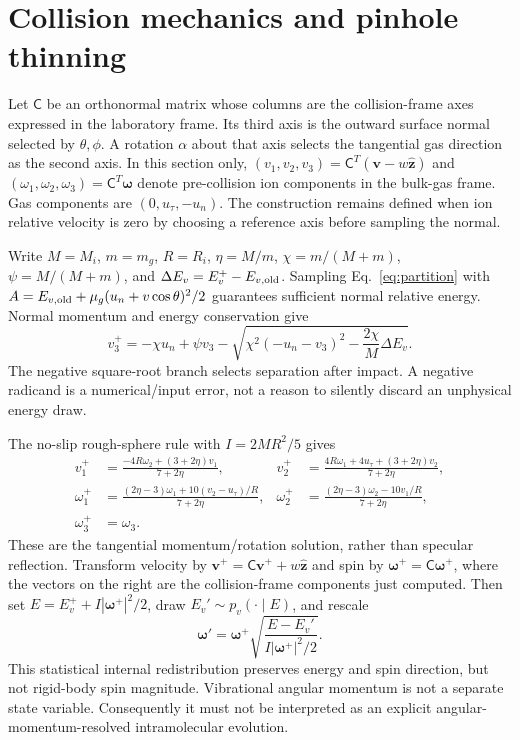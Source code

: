 \documentclass[10pt,a4paper]{article}
\begin{document}
\clearpage
\section{Collision mechanics and pinhole thinning}\label{app:collision}
Let $\mathsf C$ be an orthonormal matrix whose columns are the collision-frame
axes expressed in the laboratory frame. Its third axis is the outward surface
normal selected by $\theta,\phi$. A rotation $\alpha$ about that axis selects
the tangential gas direction as the second axis. In this section only,
$(v_1,v_2,v_3)=\mathsf C^T(\mathbf v-w\hat{\mathbf z})$ and
$(\omega_1,\omega_2,\omega_3)=\mathsf C^T\boldsymbol\omega$ denote
pre-collision ion components in the bulk-gas frame. Gas components are
$(0,u_\tau,-u_n)$. The construction remains defined when ion relative velocity
is zero by choosing a reference axis before sampling the normal.

Write $M=M_i$, $m=m_g$, $R=R_i$, $\eta=M/m$, $\chi=m/(M+m)$,
$\psi=M/(M+m)$, and $\Delta E_v=E_v^+-E_{v,\rm old}$.
Sampling Eq.~\eqref{eq:partition} with
$A=E_{v,\rm old}+\mu_g(u_n+v\cos\theta)^2/2$ guarantees sufficient normal
relative energy. Normal momentum and energy conservation give
\begin{equation}
 v_3^+=-\chi u_n+\psi v_3
 -\sqrt{\chi^2(-u_n-v_3)^2-\frac{2\chi}{M}\Delta E_v}.
 \label{eq:normalcollision}
\end{equation}
The negative square-root branch selects separation after impact. A negative
radicand is a numerical/input error, not a reason to silently discard an
unphysical energy draw.

The no-slip rough-sphere rule with $I=2MR^2/5$ gives
\begin{align}
 v_1^+&=\frac{-4R\omega_2+(3+2\eta)v_1}{7+2\eta},&
 v_2^+&=\frac{4R\omega_1+4u_\tau+(3+2\eta)v_2}{7+2\eta},\\
 \omega_1^+&=\frac{(2\eta-3)\omega_1+10(v_2-u_\tau)/R}{7+2\eta},&
 \omega_2^+&=\frac{(2\eta-3)\omega_2-10v_1/R}{7+2\eta},\\
 \omega_3^+&=\omega_3.&&
\end{align}
These are the tangential momentum/rotation solution, rather than specular
reflection. Transform velocity by $\mathbf v^+=\mathsf C\mathbf v^+
+w\hat{\mathbf z}$ and spin by $\boldsymbol\omega^+=\mathsf C\boldsymbol\omega^+$,
where the vectors on the right are the collision-frame components just computed.
Then set $E=E_v^++I|\boldsymbol\omega^+|^2/2$, draw
$E_v'\sim p_v(\cdot\mid E)$, and rescale
\[
 \boldsymbol\omega'=\boldsymbol\omega^+
 \sqrt{\frac{E-E_v'}{I|\boldsymbol\omega^+|^2/2}}.
\]
This statistical internal redistribution preserves energy and spin direction,
but not rigid-body spin magnitude. Vibrational angular momentum is not a
separate state variable. Consequently it must not be interpreted as an
explicit angular-momentum-resolved intramolecular evolution.
\end{document}
